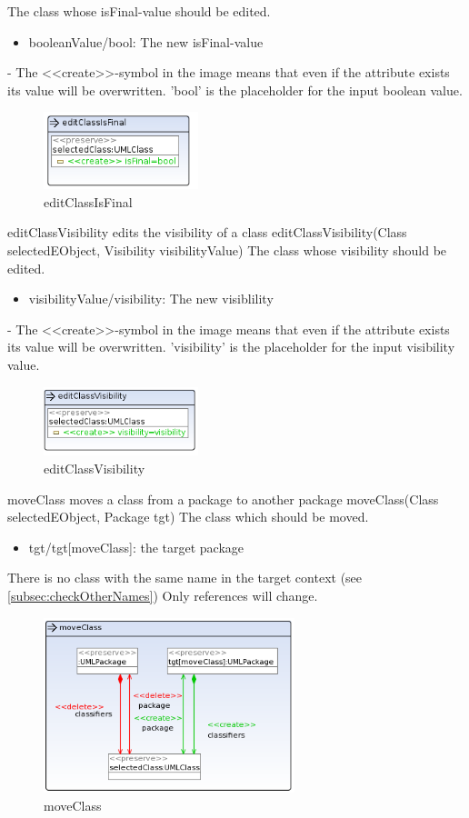 {The class whose isFinal-value should be edited.}
{
\begin{itemize}
 \item booleanValue/bool: The new isFinal-value
\end{itemize}
}
{-}
{The \textless\textless create\textgreater\textgreater  -symbol in the image
means that even if the attribute exists its value will be overwritten. 'bool'
is the placeholder for the input boolean value.}
\begin{figure}[H]
  \centering
  \includegraphics[width=0.40\textwidth]{pics/editClassIsFinal.png}
  \caption{editClassIsFinal}
  \label{editClassIsFinal}
\end{figure}
\op
{editClassVisibility}
{edits the visibility of a class}
{editClassVisibility(Class selectedEObject, Visibility visibilityValue)}
{The class whose visibility should be edited.}
{
\begin{itemize}
 \item visibilityValue/visibility: The new visiblility
\end{itemize}
}
{-}
{The \textless\textless create\textgreater\textgreater  -symbol in the image
means that even if the attribute exists its value will be overwritten.
'visibility' is the placeholder for the input visibility value.}
\begin{figure}[H]
  \centering
  \includegraphics[width=0.40\textwidth]{pics/editClassVisibility.png}
  \caption{editClassVisibility}
  \label{editClassVisibility}
\end{figure}
\op
{moveClass}
{moves a class from a package to another package}
{moveClass(Class selectedEObject, Package tgt)}
{The class which should be moved.}
{
\begin{itemize}
 \item tgt/tgt[moveClass]: the target package
\end{itemize}
}
{There is no class with the same name in the target context (see
\ref{subsec:checkOtherNames})}
{Only references will change.}
\begin{figure}[H]
  \centering
  \includegraphics[width=0.65\textwidth]{pics/moveClass.png}
  \caption{moveClass}
  \label{moveClass}
\end{figure}